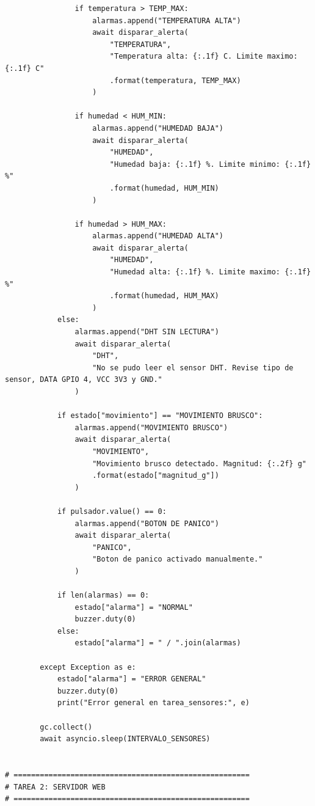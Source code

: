 \documentclass[12pt]{article}
\begin{document}
\begin{lstlisting}
                if temperatura > TEMP_MAX:
                    alarmas.append("TEMPERATURA ALTA")
                    await disparar_alerta(
                        "TEMPERATURA",
                        "Temperatura alta: {:.1f} C. Limite maximo: {:.1f} C"
                        .format(temperatura, TEMP_MAX)
                    )

                if humedad < HUM_MIN:
                    alarmas.append("HUMEDAD BAJA")
                    await disparar_alerta(
                        "HUMEDAD",
                        "Humedad baja: {:.1f} %. Limite minimo: {:.1f} %"
                        .format(humedad, HUM_MIN)
                    )

                if humedad > HUM_MAX:
                    alarmas.append("HUMEDAD ALTA")
                    await disparar_alerta(
                        "HUMEDAD",
                        "Humedad alta: {:.1f} %. Limite maximo: {:.1f} %"
                        .format(humedad, HUM_MAX)
                    )
            else:
                alarmas.append("DHT SIN LECTURA")
                await disparar_alerta(
                    "DHT",
                    "No se pudo leer el sensor DHT. Revise tipo de sensor, DATA GPIO 4, VCC 3V3 y GND."
                )

            if estado["movimiento"] == "MOVIMIENTO BRUSCO":
                alarmas.append("MOVIMIENTO BRUSCO")
                await disparar_alerta(
                    "MOVIMIENTO",
                    "Movimiento brusco detectado. Magnitud: {:.2f} g"
                    .format(estado["magnitud_g"])
                )

            if pulsador.value() == 0:
                alarmas.append("BOTON DE PANICO")
                await disparar_alerta(
                    "PANICO",
                    "Boton de panico activado manualmente."
                )

            if len(alarmas) == 0:
                estado["alarma"] = "NORMAL"
                buzzer.duty(0)
            else:
                estado["alarma"] = " / ".join(alarmas)

        except Exception as e:
            estado["alarma"] = "ERROR GENERAL"
            buzzer.duty(0)
            print("Error general en tarea_sensores:", e)

        gc.collect()
        await asyncio.sleep(INTERVALO_SENSORES)


# ======================================================
# TAREA 2: SERVIDOR WEB
# ======================================================


\end{lstlisting}
\end{document}
